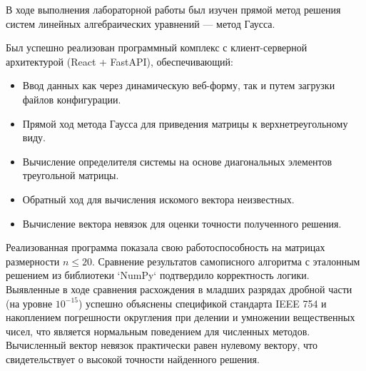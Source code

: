 \documentclass[a4paper,12pt]{article}
\begin{document}
В ходе выполнения лабораторной работы был изучен прямой метод решения систем линейных алгебраических уравнений — метод Гаусса. 

Был успешно реализован программный комплекс с клиент-серверной архитектурой (React + FastAPI), обеспечивающий:
\begin{itemize}
    \item Ввод данных как через динамическую веб-форму, так и путем загрузки файлов конфигурации.
    \item Прямой ход метода Гаусса для приведения матрицы к верхнетреугольному виду.
    \item Вычисление определителя системы на основе диагональных элементов треугольной матрицы.
    \item Обратный ход для вычисления искомого вектора неизвестных.
    \item Вычисление вектора невязок для оценки точности полученного решения.
\end{itemize}

Реализованная программа показала свою работоспособность на матрицах размерности $n \le 20$. Сравнение результатов самописного алгоритма с эталонным решением из библиотеки `NumPy` подтвердило корректность логики. Выявленные в ходе сравнения расхождения в младших разрядах дробной части (на уровне $10^{-15}$) успешно объяснены спецификой стандарта IEEE 754 и накоплением погрешности округления при делении и умножении вещественных чисел, что является нормальным поведением для численных методов. Вычисленный вектор невязок практически равен нулевому вектору, что свидетельствует о высокой точности найденного решения.
\end{document}
